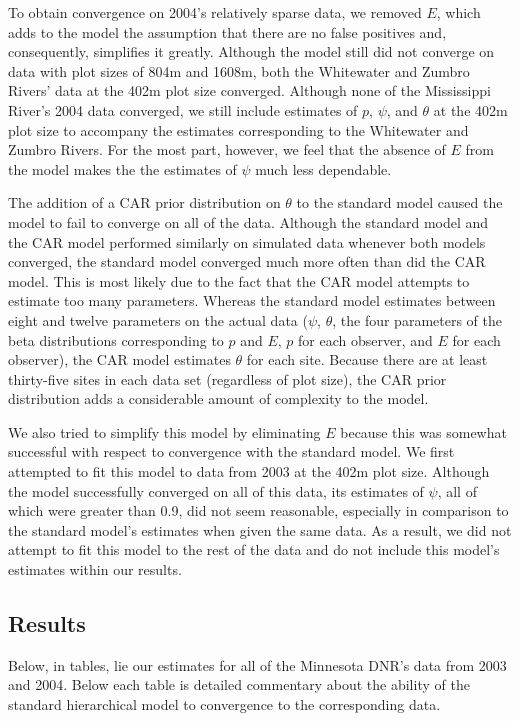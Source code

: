 \documentclass{article}
\begin{document}
    To obtain convergence on 2004's relatively sparse data, we removed \(E\),
    which adds to the model the assumption that there are no false positives
    and, consequently, simplifies it greatly.  Although the model still did not
    converge on data with plot sizes of 804m and 1608m, both the Whitewater and
    Zumbro Rivers' data at the 402m plot size converged.  Although none of the
    Mississippi River's 2004 data converged, we still include estimates of
    \(p\), \(\psi\), and \(\theta\) at the 402m plot size to accompany the
    estimates corresponding to the Whitewater and Zumbro Rivers.  For the most
    part, however, we feel that the absence of \(E\) from the model makes the
    the estimates of \(\psi\) much less dependable.

    The addition of a CAR prior distribution on \(\theta\) to the standard model
    caused the model to fail to converge on all of the data.  Although the
    standard model and the CAR model performed similarly on simulated data
    whenever both models converged, the standard model converged much more often
    than did the CAR model.  This is most likely due to the fact that the CAR
    model attempts to estimate too many parameters.  Whereas the standard model
    estimates between eight and twelve parameters on the actual data (\(\psi\),
    \(\theta\), the four parameters of the beta distributions corresponding to
    \(p\) and \(E\), \(p\) for each observer, and \(E\) for each observer), the
    CAR model estimates \(\theta\) for each site.  Because there are at least
    thirty-five sites in each data set (regardless of plot size), the CAR prior
    distribution adds a considerable amount of complexity to the model.

    We also tried to simplify this model by eliminating \(E\) because this was
    somewhat successful with respect to convergence with the standard model.
    We first attempted to fit this model to data from 2003 at the 402m plot
    size.  Although the model successfully converged on all of this data, its
    estimates of \(\psi\), all of which were greater than 0.9, did not seem
    reasonable, especially in comparison to the standard model's estimates when
    given the same data.  As a result, we did not attempt to fit this model to
    the rest of the data and do not include this model's estimates within our
    results.

    \subsection{Results}
    Below, in tables, lie our estimates for all of the Minnesota DNR's data from
    2003 and 2004.  Below each table is detailed commentary about the ability of
    the standard hierarchical model to convergence to the corresponding data. \\
\end{document}
